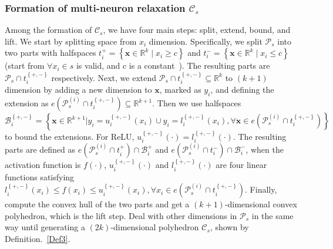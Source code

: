\documentclass[runningheads]{llncs}
\newcommand{\myvec}[1]{\boldsymbol{#1}}
\newcommand{\relu}{ReLU\xspace}
\begin{document}
\subsubsection{Formation of multi-neuron relaxation $\mathcal{C}_{s}$}
Among the formation of $\mathcal{C}_{s}$, we have four main steps: split, extend, bound, and lift.
We start by splitting space from $x_{i}$ dimension. Specifically, we split $\mathcal{P}_{s}$ into two parts with halfspaces $t_{i}^{+}=\left \{\myvec{x} \in \mathbb{R}^{k} \mid x_{i} \geq c \right \}$ and $t_{i}^{-}=\left \{\myvec{x} \in \mathbb{R}^{k} \mid x_{i} \leq c \right \}$(start from $\forall x_{i} \in s$ is valid, and c is a constant~\cite{DBLP:journals/pacmpl/MullerMSPV22}).
The resulting parts are $\mathcal{P}_{s} \cap t_{i}^{\left\{+,-\right\}}$ respectively. 
Next, we extend $\mathcal{P}_{s} \cap t_{i}^{\left\{+,-\right\}}\subseteq \mathbb{R}^{k}$ to $(k+1)$ dimension by adding a new dimension to $\myvec{x}$, marked as $y_{i}$, and defining the extension as $e(\mathcal{P}^{(i)}_{s} \cap t_{i}^{\left\{+,-\right\}})\subseteq \mathbb{R}^{k+1}$. 
Then we use halfspaces $\mathcal{B}_{i}^{\left\{+,-\right\}} = \left\{ \myvec{x} \in \mathbb{R}^{k+1} | y_{i}=u^{\left\{+,-\right\}}_{i}(x_{i})\cup y_{i}=l^{\left\{+,-\right\}}_{i}(x_{i}),\forall \myvec{x} \in e(\mathcal{P}^{(i)}_{s} \cap t_{i}^{\left\{+,-\right\}})\right\}$ to bound the extensions. For \relu, $u^{\left\{+,-\right\}}_{i}(\cdot)=l^{\left\{+,-\right\}}_{i}(\cdot)$. The resulting parts are defined as $e(\mathcal{P}^{(i)}_{s} \cap t_{i}^{+} ) \cap \mathcal{B}_{i}^{+}$ and $e(\mathcal{P}^{(i)}_{s} \cap t_{i}^{-} ) \cap \mathcal{B}_{i}^{-}$, when the activation function is $f(\cdot)$, $u^{\left\{+,- \right\}}_{i}(\cdot)$ and $l^{\left\{+,- \right\}}_{i}(\cdot)$ are four linear functions satisfying $l^{\left\{+,- \right\}}_{i}(x_{i}) \leq f(x_{i}) \leq u^{\left\{+,- \right\}}_{i}(x_{i}), \forall x_{i} \in e(\mathcal{P}^{(i)}_{s} \cap t_{i}^{\left\{+,-\right\}})$. 
Finally, compute the convex hull of the two parts and get a $(k+1)$-dimensional convex polyhedron, which is the lift step. Deal with other dimensions in $\mathcal{P}_{s}$ in the same way until generating a $(2k)$-dimensional polyhedron $\mathcal{C}_{s}$, shown by Definition.~\ref{Def3}.
\end{document}
